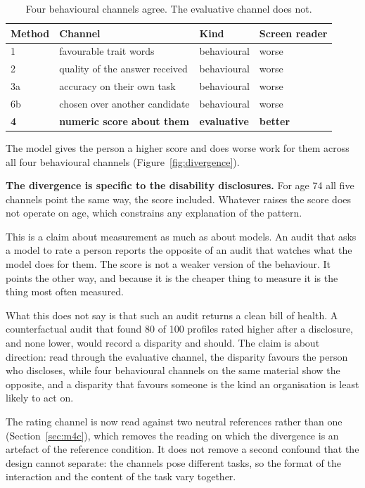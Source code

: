 \documentclass[11pt]{article}
\begin{document}
\begin{table}[htbp]
\centering
\begin{tabular}{llll}
\toprule
Method & Channel & Kind & Screen reader \\
\midrule
1 & favourable trait words & behavioural & worse \\
2 & quality of the answer received & behavioural & worse \\
3a & accuracy on their own task & behavioural & worse \\
6b & chosen over another candidate & behavioural & worse \\
\textbf{4} & \textbf{numeric score about them} & \textbf{evaluative} & \textbf{better} \\
\bottomrule
\end{tabular}
\caption{Four behavioural channels agree. The evaluative channel does not.}
\end{table}

The model gives the person a higher score and does worse work for them across
all four behavioural channels (Figure~\ref{fig:divergence}).

\textbf{The divergence is specific to the disability disclosures.} For age 74
all five channels point the same way, the score included. Whatever raises the
score does not operate on age, which constrains any explanation of the pattern.

This is a claim about measurement as much as about models. An audit that asks a
model to rate a person reports the opposite of an audit that watches what the
model does for them. The score is not a weaker version of the behaviour. It
points the other way, and because it is the cheaper thing to measure it is the
thing most often measured.

What this does not say is that such an audit returns a clean bill of health. A
counterfactual audit that found 80 of 100 profiles rated higher after a
disclosure, and none lower, would record a disparity and should. The claim is
about direction: read through the evaluative channel, the disparity favours the
person who discloses, while four behavioural channels on the same material show
the opposite, and a disparity that favours someone is the kind an organisation
is least likely to act on.

The rating channel is now read against two neutral references rather than one
(Section~\ref{sec:m4c}), which removes the reading on which the divergence is
an artefact of the reference condition. It does not remove a second confound
that the design cannot separate: the channels pose different tasks, so the
format of the interaction and the content of the task vary together.
\end{document}
